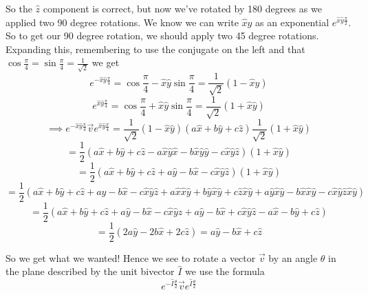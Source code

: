 \documentclass[options]{report}
\def \v{\vec{v}}
\def \xhat{\hat{x}}
\def \yhat{\hat{y}}
\def \zhat{\hat{z}}
\begin{document}
So the $\zhat$ component is correct, but now we've rotated by 180 degrees as we applied two 90 degree rotations. We know we can write $\xhat \yhat$ as an exponential $e^{\xhat \yhat \frac{\pi}{2}}$. So to get our 90 degree rotation, we should apply two 45 degree rotations. Expanding this, remembering to use the conjugate on the left and that $\cos \frac{\pi}{4} = \sin \frac{\pi}{4} = \frac{1}{\sqrt{2}}$ we get
\begin{equation*}
	e^{-\xhat\yhat \frac{\pi}{4}} = \cos \frac{\pi}{4} - \xhat \yhat \sin \frac{\pi}{4} = \frac{1}{\sqrt{2}} (1 - \xhat \yhat)
\end{equation*}
\begin{equation*}
	e^{\xhat\yhat \frac{\pi}{4}} = \cos \frac{\pi}{4} + \xhat \yhat \sin \frac{\pi}{4} = \frac{1}{\sqrt{2}} (1 + \xhat \yhat)
\end{equation*}
\begin{equation*}
	\implies e^{-\xhat\yhat \frac{\pi}{4}} \v e^{\xhat\yhat \frac{\pi}{4}} = \frac{1}{\sqrt{2}} (1 - \xhat \yhat) (a \xhat + b \yhat + c \zhat) \frac{1}{\sqrt{2}} (1 + \xhat \yhat)
\end{equation*}
\begin{equation*}
	= \frac{1}{2} (a \xhat + b \yhat + c\zhat - a \xhat \yhat \xhat - b \xhat \yhat \yhat - c \xhat \yhat \zhat) (1 + \xhat \yhat)
\end{equation*}
\begin{equation*}
	= \frac{1}{2} (a \xhat + b \yhat + c\zhat + a \yhat - b \xhat - c \xhat \yhat \zhat) (1 + \xhat \yhat)
\end{equation*}
\begin{equation*}
	= \frac{1}{2} (a \xhat + b \yhat + c\zhat + a \yhat - b \xhat - c \xhat \yhat \zhat + a \xhat \xhat \yhat + b \yhat \xhat \yhat + c \zhat \xhat \yhat + a \yhat \xhat \yhat - b \xhat \xhat \yhat - c \xhat \yhat \zhat \xhat \yhat)
\end{equation*}
\begin{equation*}
	= \frac{1}{2} (a \xhat + b \yhat + c\zhat + a \yhat - b \xhat - c \xhat \yhat \zhat + a \yhat - b \xhat + c \xhat \yhat \zhat - a \xhat - b \yhat + c \zhat)
\end{equation*}
\begin{equation*}
	= \frac{1}{2} (2a \yhat - 2b \xhat + 2c \zhat) = a \yhat - b \xhat + c \zhat
\end{equation*}

So we get what we wanted! Hence we see to rotate a vector $\v$ by an angle $\theta$ in the plane described by the unit bivector $\hat{I}$ we use the formula
\begin{equation}
	e^{-\hat{I} \frac{\theta}{2}} \v e^{\hat{I} \frac{\theta}{2}}
\end{equation}
\end{document}
